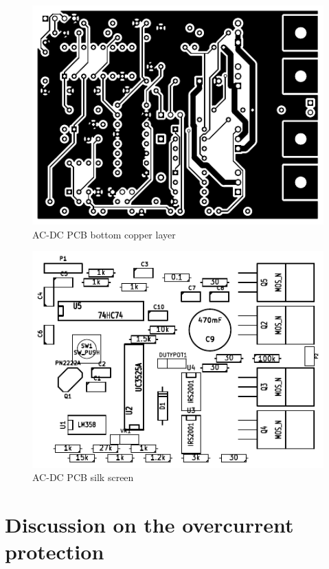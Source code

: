 \documentclass[final]{scrreprt} %
\begin{document}
\begin{figure}[h]
	\begin{center}
		\includegraphics[width=\linewidth/2]{resources/DC-AC-B_CU-rc.pdf}
	\end{center}
	\caption{AC-DC PCB bottom copper layer}
	\label{fig:PCBcopperBottom}
\end{figure}

\begin{figure}[h]
	\begin{center}
		\includegraphics[width=\linewidth/2]{resources/DC-AC-F_SilkS-rc.pdf}
	\end{center}
	\caption{AC-DC PCB silk screen}
	\label{fig:PCBcomponents}
\end{figure}



\chapter{Discussion on the overcurrent protection}
\end{document}
